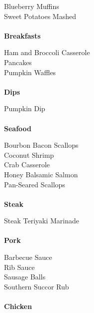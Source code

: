\documentclass[11pt, twoside, openany]{book}
\begin{document}
Blueberry Muffins\hrulefill\pageref{blueberry-muffins}\\
Sweet Potatoes Mashed\hrulefill\pageref{sweet-potatoes-mashed}\\
{~\vspace{2mm}\\ \Large \textbf{Breakfasts}}\hfill\textbf{\pageref{breakfasts}}

Ham and Broccoli Casserole\hrulefill\pageref{ham-and-broccoli-casserole}\\
Pancakes\hrulefill\pageref{pancakes}\\
Pumpkin Waffles\hrulefill\pageref{pumpkin-waffles}\\
{~\vspace{2mm}\\ \Large \textbf{Dips}}\hfill\textbf{\pageref{dips}}

Pumpkin Dip\hrulefill\pageref{pumpkin-dip}\\
{~\vspace{2mm}\\ \Large \textbf{Seafood}}\hfill\textbf{\pageref{seafood}}

Bourbon Bacon Scallops\hrulefill\pageref{bourbon-bacon-scallops}\\
Coconut Shrimp\hrulefill\pageref{coconut-shrimp}\\
Crab Casserole\hrulefill\pageref{crab-casserole}\\
Honey Balsamic Salmon\hrulefill\pageref{honey-balsamic-salmon}\\
Pan-Seared Scallops\hrulefill\pageref{pan-seared-scallops}\\
{~\vspace{2mm}\\ \Large \textbf{Steak}}\hfill\textbf{\pageref{steak}}

Steak Teriyaki Marinade\hrulefill\pageref{steak-teriyaki-marinade}\\
{~\vspace{2mm}\\ \Large \textbf{Pork}}\hfill\textbf{\pageref{pork}}

Barbecue Sauce\hrulefill\pageref{barbecue-sauce}\\
Rib Sauce\hrulefill\pageref{rib-sauce}\\
Sausage Balls\hrulefill\pageref{sausage-balls}\\
Southern Succor Rub\hrulefill\pageref{southern-succor-rub}\\
{~\vspace{2mm}\\ \Large \textbf{Chicken}}\hfill\textbf{\pageref{chicken}}
\end{document}
